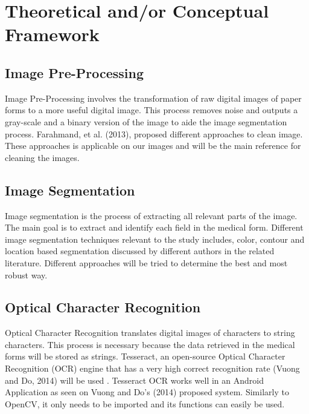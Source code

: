 %
%
%                 

\chapter{Theoretical and/or Conceptual Framework}
\label{sec:appendixb}

\section{Image Pre-Processing}
Image Pre-Processing involves the transformation of raw digital images of paper forms to a more useful digital image. This process removes noise and outputs a gray-scale and a binary version of the image to aide the image segmentation process. Farahmand, et al. (2013), proposed different approaches to clean image. These approaches is applicable on our images and will be the main reference for cleaning the images. 

\section{Image Segmentation}
Image segmentation is the process of extracting all relevant parts of the	image. The main goal is to extract and identify each field in the medical form. Different image segmentation techniques relevant to the study includes, color, contour and location based segmentation discussed by different authors in the related literature. Different approaches will be tried to determine the best and most robust way. 

\section{Optical Character Recognition}
Optical Character Recognition translates digital images of characters to string characters. This process is necessary because the data retrieved in the medical forms will be stored as strings. Tesseract, an open-source Optical Character Recognition (OCR) engine that has a very high correct recognition rate (Vuong and Do, 2014) will be used . Tesseract OCR works well in an Android Application as seen on Vuong and Do’s (2014) proposed system. Similarly to OpenCV, it only needs to be imported and its functions can easily be used.
